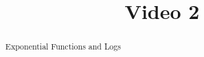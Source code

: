 \documentclass[handout]{ximera}
\title{Video 2}
\begin{document}
\begin{abstract}
Exponential Functions and Logs
\end{abstract}

\maketitle

\end{document}
